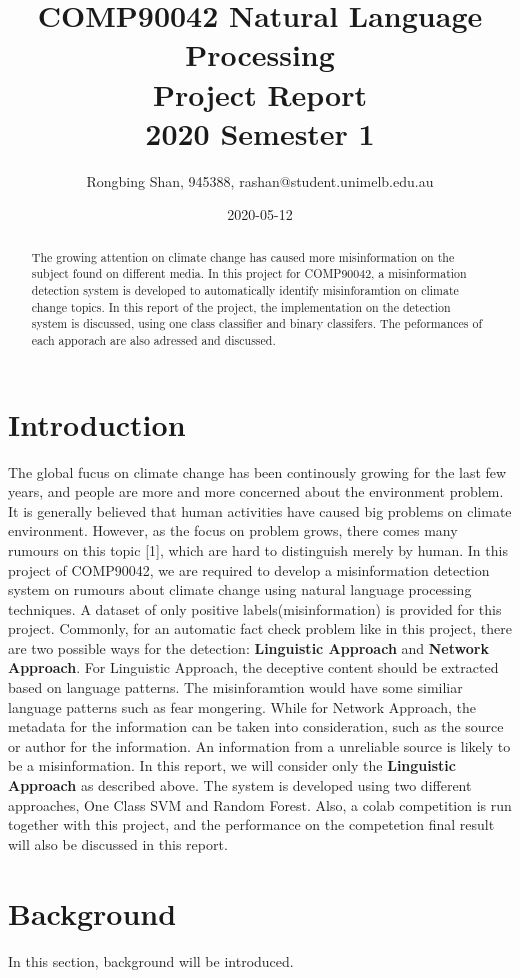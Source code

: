 \documentclass[11pt,a4paper]{article}
\title{COMP90042 Natural Language Processing\\
Project Report\\
2020 Semester 1}
\author{Rongbing Shan, 945388, rashan@student.unimelb.edu.au}
\date{2020-05-12}
\begin{document}
\maketitle
\begin{abstract}
The growing attention on climate change has caused more misinformation on the subject found on different media. In this project for COMP90042, a misinformation detection system is developed to automatically identify misinforamtion on climate change topics. In this report of the project, the implementation on the detection system is discussed, using one class classifier and binary classifers. The peformances of each apporach are also adressed and discussed.
\end{abstract}

\section{Introduction}

The global fucus on climate change has been continously growing for the last few years, and people are more and more concerned about the environment problem. It is generally believed that human activities have caused big problems on climate environment. However, as the focus on problem grows, there comes many rumours on this topic [1], which are hard to distinguish merely by human.
In this project of COMP90042, we are required to develop a misinformation detection system on rumours about climate change using natural language processing techniques. A dataset of only positive labels(misinformation) is provided for this project.
Commonly, for an automatic fact check problem like in this project, there are two possible ways for the detection: \textbf{Linguistic Approach} and \textbf{Network Approach}. For Linguistic Approach, the deceptive content should be extracted based on language patterns. The misinforamtion would have some similiar language patterns such as fear mongering. While for Network Approach, the metadata for the information can be taken into consideration, such as the source or author for the information. An information from a unreliable source is likely to be a misinformation. In this report, we will consider only the \textbf{Linguistic Approach} as described above. 
The system is developed using two different approaches, One Class SVM and Random Forest.
Also, a colab competition is run together with this project, and the performance on the competetion final result will also be discussed in this report.

\section{Background}
In this section, background will be introduced.
\end{document}
